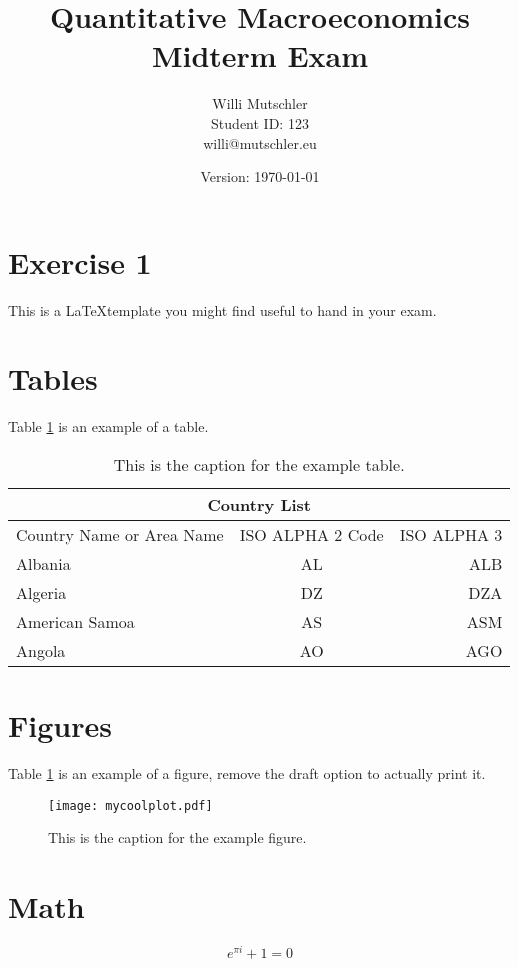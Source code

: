 \documentclass[a4paper]{scrartcl}
\begin{document}
\title{Quantitative Macroeconomics\\Midterm Exam}
\author{Willi Mutschler\\Student ID: 123\\willi@mutschler.eu}
\date{Version: \today}
\maketitle\thispagestyle{empty}

\newpage
\tableofcontents\thispagestyle{empty}\newpage \setcounter{page}{1}

\section{Exercise 1}\label{sec:introduction}
This is a \LaTeX template you might find useful to hand in your exam.

\section{Tables}
Table \ref{tbl:1} is an example of a table.
\begin{table}[h!]
  \centering
  \begin{tabular}{|l|c|r|}
  \hline
  \multicolumn{3}{|c|}{Country List} \\
  \hline
  Country Name or Area Name& ISO ALPHA 2 Code &ISO ALPHA 3 \\ \hline
  Albania &AL & ALB \\
  Algeria &DZ & DZA \\
  American Samoa & AS & ASM \\
  Angola & AO & AGO \\
  \hline
  \end{tabular}
  \caption{This is the caption for the example table.} \label{tbl:1}
\end{table}

\section{Figures}
Table \ref{fig:1} is an example of a figure, remove the draft option to actually print it.
\begin{figure}[t!]\centering
  \texttt{[image: mycoolplot.pdf]}
  \caption{This is the caption for the example figure.}
  \label{fig:1}
\end{figure}

\section{Math}
\begin{equation}
e^{\pi i} + 1 = 0\label{eq:euler}
\end{equation}
\end{document}
